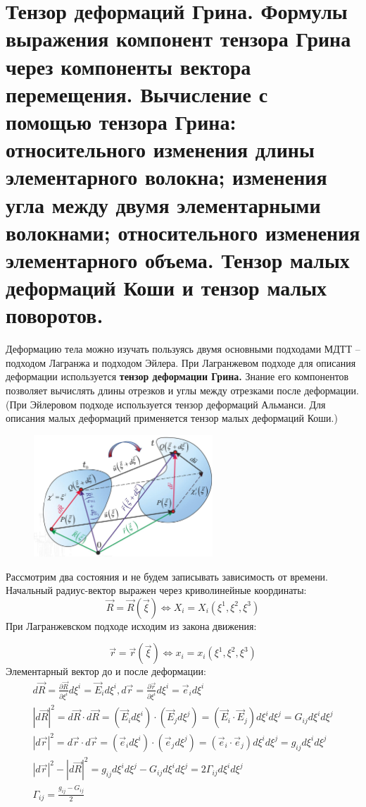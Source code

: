\section{Тензор деформаций Грина. Формулы выражения компонент тензора Грина через компоненты вектора перемещения. Вычисление с помощью тензора Грина: относительного изменения длины элементарного волокна; изменения угла между двумя элементарными волокнами; относительного изменения элементарного объема. Тензор малых деформаций Коши и тензор малых поворотов.}
Деформацию тела можно изучать пользуясь двумя основными подходами МДТТ – подходом Лагранжа и подходом Эйлера. При Лагранжевом подходе для описания деформации используется \textbf{тензор деформации Грина.} Знание его компонентов позволяет вычислять длины отрезков и углы между отрезками после деформации. (При Эйлеровом подходе используется тензор деформаций Альманси. Для описания малых деформаций применяется тензор малых деформаций Коши.)

\begin{figure}[h!]
  \centering
  \includegraphics[width=0.6\textwidth]{images/10.1.jpg}
\end{figure}


Рассмотрим два состояния и не будем записывать зависимость от времени. Начальный радиус-вектор выражен через криволинейные координаты:
$$
\vec{R}=\vec{R}(\vec{\xi}) \Leftrightarrow X_i=X_i\left(\xi^1, \xi^2, \xi^3\right)
$$
При Лагранжевском подходе исходим из закона движения:

$$
\vec{r}=\vec{r}(\vec{\xi}) \Leftrightarrow x_i=x_i\left(\xi^1, \xi^2, \xi^3\right)
$$
Элементарный вектор до и после деформации:
$$
\begin{gathered}
d \vec{R}=\frac{\partial \vec{R}}{\partial \xi^i} d \xi^i=\vec{E}_i d \xi^i, d \vec{r}=\frac{\partial \vec{r}}{\partial \xi^i} d \xi^i=\vec{e}_i d \xi^i \\
|d \vec{R}|^2=d \vec{R} \cdot d \vec{R}=\left(\vec{E}_i d \xi^i\right) \cdot\left(\vec{E}_j d \xi^j\right)=\left(\vec{E}_i \cdot \vec{E}_j\right) d \xi^i d \xi^j=G_{i j} d \xi^i d \xi^j \\
|d \vec{r}|^2=d \vec{r} \cdot d \vec{r}=\left(\vec{e}_i d \xi^i\right) \cdot\left(\vec{e}_j d \xi^j\right)=\left(\vec{e}_i \cdot \vec{e}_j\right) d \xi^i d \xi^j=g_{i j} d \xi^i d \xi^j \\
|d \vec{r}|^2-|d \vec{R}|^2=g_{i j} d \xi^i d \xi^j-G_{i j} d \xi^i d \xi^j=2 \Gamma_{i j} d \xi^i d \xi^j \\
\Gamma_{i j}=\frac{g_{i j}-G_{i j}}{2}
\end{gathered}
$$

